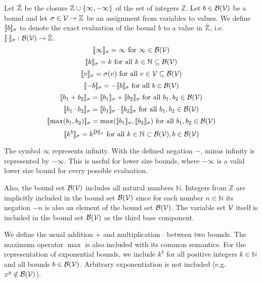 \begin{definition}
  Let $\bar{\mathbb{Z}}$ be the closure $\mathbb{Z} \cup \lbrace \infty, -\infty \rbrace$ of the set of integers $\mathbb{Z}$.
  Let $b \in \mathcal{B}(\mathcal{V})$ be a bound and let $\sigma \in \mathcal{V} \rightarrow \mathbb{Z}$ be an assignment from variables to values.
  We define $\llbracket b \rrbracket_{\sigma}$ to denote the exact evaluation of the bound $b$ to a value in $\bar{\mathbb{Z}}$, i.e. $\llbracket \cdot \rrbracket_{\sigma}: \mathcal{B}(\mathcal{V}) \rightarrow \bar{\mathbb{Z}}$.
  \[ \llbracket \infty \rrbracket_{\sigma} = \infty \text{ for } \infty \in \mathcal{B}(\mathcal{V}) \]
  \[ \llbracket k \rrbracket_{\sigma} = k \text{ for all } k \in \mathbb{N} \subseteq \mathcal{B}(\mathcal{V}) \] 
  \[ \llbracket v \rrbracket_{\sigma} = \sigma(v) \text{ for all } v \in \mathcal{V} \subseteq \mathcal{B}(\mathcal{V}) \] 
  \[ \llbracket -b \rrbracket_{\sigma} = -\llbracket b \rrbracket_{\sigma} \text{ for all } b \in \mathcal{B}(\mathcal{V}) \] 
  \[ \llbracket b_1 + b_2 \rrbracket_{\sigma} = \llbracket b_1 \rrbracket_{\sigma} + \llbracket b_2 \rrbracket_{\sigma} \text{ for all } b_1, b_2 \in \mathcal{B}(\mathcal{V}) \] 
  \[ \llbracket b_1 \cdot b_2 \rrbracket_{\sigma} = \llbracket b_1 \rrbracket_{\sigma} \cdot \llbracket b_2 \rrbracket_{\sigma} \text{ for all } b_1, b_2 \in \mathcal{B}(\mathcal{V}) \] 
  \[ \llbracket \max(b_1, b_2) \rrbracket_{\sigma} = \max(\llbracket b_1 \rrbracket_{\sigma}, \llbracket b_2 \rrbracket_{\sigma}) \text{ for all } b_1, b_2 \in \mathcal{B}(\mathcal{V}) \]
  \[ \llbracket k^b \rrbracket_{\sigma} = k^{\llbracket b \rrbracket_{\sigma}} \text{ for all } k \in \mathbb{N} \subset \mathcal{B}(\mathcal{V}), b \in \mathcal{B}(\mathcal{V}) \]  
\end{definition}
The symbol $\infty$ represents infinity.
With the defined negation $-$, minus infinity is represented by $-\infty$.
This is useful for lower size bounds, where $-\infty$ is a valid lower size bound for every possible evaluation.

Also, the bound set $\mathcal{B}(\mathcal{V})$ includes all natural numbers $\mathbb{N}$.
Integers from $\mathbb{Z}$ are implicitly included in the bound set $\mathcal{B}(\mathcal{V})$ since for each number $n \in \mathbb{N}$ its negation $-n$ is also an element of the bound set $\mathcal{B}(\mathcal{V})$.
The variable set $\mathcal{V}$ itself is included in the bound set $\mathcal{B}(\mathcal{V})$ as the third base component.

We define the usual addition $+$ and multiplication $\cdot$ between two bounds.
The maximum operator $\max$ is also included with its common semantics.
For the representation of exponential bounds, we include $k^b$ for all positive integers $k \in \mathbb{N}$ and all bounds $b \in \mathcal{B}(\mathcal{V})$.
Arbitrary exponentiation is not included (e.g. $x^y \notin \mathcal{B}(\mathcal{V})$).

